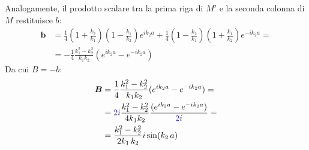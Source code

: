\documentclass[../../FisicaTeorica.tex]{subfiles}
\begin{document}
Analogamente, il prodotto scalare tra la prima riga di $M'$ e la seconda colonna di $M$ restituisce $b$:
\begin{align*}
\bm{b}&=\frac{1}{4}\left(1+\frac{k_2}{k_1}\right)\left(1-\frac{k_1}{k_2}\right) e^{ik_2 a} + \frac{1}{4}\left(1-\frac{k_2}{k_1}\right)\left(1+\frac{k_1}{k_2}\right)e^{-ik_2 a}=\\
&=-\frac{1}{4} \frac{k_1^2-k_2^2}{k_1 k_2}\left(e^{ik_2 a}-e^{-ik_2 a}\right)
\end{align*}
Da cui $B=-b$:
\begin{align*}
\bm{B}&=\frac{1}{4}\frac{k_1^2-k_2^2}{k_1k_2}(e^{ik_2a}-e^{-ik_2 a})=\\
&=\textcolor{Blue}{2i}\frac{k_1^2-k_2^2}{4k_1k_2} \frac{(e^{ik_2a}-e^{-ik_2a})}{\textcolor{Blue}{2i}} =\\
&=\frac{k_1^2-k_2^2}{2k_1\,k_2}i\sin(k_2\,a)
\end{align*}
\end{document}
